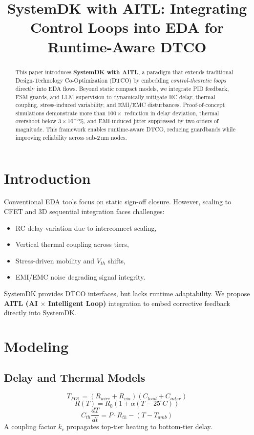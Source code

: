 \documentclass[conference]{IEEEtran}
\title{SystemDK with AITL: Integrating Control Loops into EDA for Runtime-Aware DTCO}
\author{
  \IEEEauthorblockN{Shinichi Samizo}
  \IEEEauthorblockA{Independent Semiconductor Researcher\\
  Email: \href{mailto:shin3t72@gmail.com}{shin3t72@gmail.com}}
}
\begin{document}
\maketitle

\begin{abstract}
This paper introduces \textbf{SystemDK with AITL}, a paradigm that extends
traditional Design-Technology Co-Optimization (DTCO) by embedding 
\emph{control-theoretic loops} directly into EDA flows.
Beyond static compact models, we integrate PID feedback, FSM guards, 
and LLM supervision to dynamically mitigate RC delay, thermal coupling, 
stress-induced variability, and EMI/EMC disturbances. 
Proof-of-concept simulations demonstrate more than $100\times$ reduction in 
delay deviation, thermal overshoot below $3\times 10^{-5}\%$, 
and EMI-induced jitter suppressed by two orders of magnitude. 
This framework enables runtime-aware DTCO, reducing guardbands 
while improving reliability across sub-2\,nm nodes.
\end{abstract}

\section{Introduction}
Conventional EDA tools focus on static sign-off closure. 
However, scaling to CFET and 3D sequential integration faces challenges:
\begin{itemize}
  \item RC delay variation due to interconnect scaling,
  \item Vertical thermal coupling across tiers,
  \item Stress-driven mobility and $V_{th}$ shifts,
  \item EMI/EMC noise degrading signal integrity.
\end{itemize}
SystemDK provides DTCO interfaces, but lacks runtime adaptability.
We propose \textbf{AITL (AI $\times$ Intelligent Loop)} integration to 
embed corrective feedback directly into SystemDK.

\section{Modeling}
\subsection{Delay and Thermal Models}
\begin{equation}
T_{FO1} = (R_{wire}+R_{via})(C_{load}+C_{inter})
\end{equation}
\begin{equation}
R(T) = R_0 \left(1 + \alpha (T-25^\circ C)\right)
\end{equation}
\begin{equation}
C_{th}\frac{dT}{dt} = P\cdot R_{th} - (T-T_{amb})
\end{equation}
A coupling factor $k_c$ propagates top-tier heating to bottom-tier delay.
\end{document}
